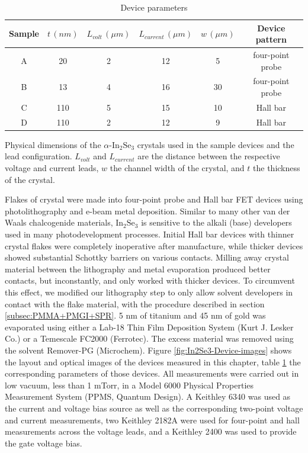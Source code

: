 \noindent 
\begin{table}
\begin{centering}
\begin{tabular}{|c|c|c|c|c|c|}
\hline 
Sample & $t\,(nm)$ & $L_{volt}\,\left(\mu m\right)$ & $L_{current}\,\left(\mu m\right)$ & $w\,\left(\mu m\right)$ & Device pattern\tabularnewline
\hline 
\hline 
A & 20 & 2 & 12 & 5 & four-point probe\tabularnewline
\hline 
B & 13 & 4 & 16 & 30 & four-point probe\tabularnewline
\hline 
C & 110 & 5 & 15 & 10 & Hall bar\tabularnewline
\hline 
D & 110 & 2 & 12 & 9 & Hall bar\tabularnewline
\hline 
\end{tabular}
\par\end{centering}
\caption{Device parameters\label{tab:In2Se3-Device-parameters}}

Physical dimensions of the $\ensuremath{\alpha}\textrm{-In}_{2}\textrm{Se}_{3}$
crystals used in the sample devices and the lead configuration. $L_{volt}$
and $L_{current}$ are the distance between the respective voltage
and current leads, $w$ the channel width of the crystal, and $t$
the thickness of the crystal. 
\end{table}

Flakes of crystal were made into four-point probe and Hall bar FET
devices using photolithography and e-beam metal deposition. Similar
to many other van der Waals chalcogenide materials, $\textrm{In}_{2}\textrm{Se}_{3}$
is sensitive to the alkali (base) developers used in many photodevelopment
processes.\citep{choi2011su8protective,choi2008aprotective} Initial
Hall bar devices with thinner crystal flakes were completely inoperative
after manufacture, while thicker devices showed substantial Schottky
barriers on various contacts. Milling away crystal material between
the lithography and metal evaporation produced better contacts, but
inconstantly, and only worked with thicker devices. To circumvent
this effect, we modified our lithography step to only allow solvent
developers in contact with the flake material, with the procedure
described in section \ref{subsec:PMMA+PMGI+SPR}. 5 nm of titanium
and 45 nm of gold was evaporated using either a Lab-18 Thin Film Deposition
System (Kurt J. Lesker Co.) or a Temescale FC2000 (Ferrotec). The
excess material was removed using the solvent Remover-PG (Microchem).
Figure \ref{fig:In2Se3-Device-images} shows the layout and optical
images of the devices measured in this chapter, table \ref{tab:In2Se3-Device-parameters}
the corresponding parameters of those devices. All measurements were
carried out in low vacuum, less than 1 mTorr, in a Model 6000 Physical
Properties Measurement System (PPMS, Quantum Design). A Keithley 6340
was used as the current and voltage bias source as well as the corresponding
two-point voltage and current measurements, two Keithley 2182A were
used for four-point and hall measurements across the voltage leads,
and a Keithley 2400 was used to provide the gate voltage bias.

